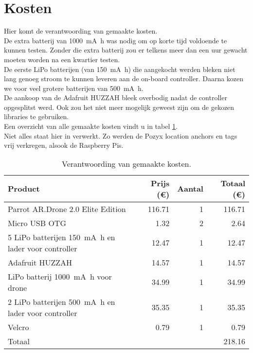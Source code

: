 \section{Kosten}
Hier komt de verantwoording van gemaakte kosten.\\
De extra batterij van \SI{1000}{\mA\hour} was nodig om op korte tijd voldoende te kunnen testen. Zonder die extra batterij zou er telkens meer dan een uur gewacht moeten worden na een kwartier testen.\\
De eerste LiPo batterijen (van \SI{150}{\mA\hour}) die aangekocht werden bleken niet lang genoeg stroom te kunnen leveren aan de on-board controller. Daarna kozen we voor veel grotere batterijen van \SI{500}{\mA\hour}.\\
De aankoop van de Adafruit HUZZAH bleek overbodig nadat de controller opgesplitst werd. Ook zou het niet meer mogelijk geweest zijn om de gekozen libraries te gebruiken.\\

Een overzicht van alle gemaakte kosten vindt u in tabel \ref{tab:kosten}.\\
Niet alles staat hier in verwerkt. Zo werden de Pozyx location anchors en tags vrij verkregen, alsook de Raspberry Pis.
\begin{table}[p]
\centering
\begin{tabular}{ |l|r|r|r| } \hline
Product & Prijs (\euro{}) & Aantal & Totaal (\euro{}) \\ [.5ex] \hline \hline
Parrot AR.Drone 2.0 Elite Edition & 116.71 & 1 & 116.71 \\ \hline
Micro USB OTG & 1.32 & 2 & 2.64 \\ \hline
5 LiPo batterijen \SI{150}{\mA\hour} en lader voor controller & 12.47 & 1 & 12.47 \\ \hline
Adafruit HUZZAH & 14.57 & 1 & 14.57 \\ \hline
LiPo batterij \SI{1000}{\mA\hour} voor drone & 34.99 & 1 & 34.99 \\ \hline
2 LiPo batterijen \SI{500}{\mA\hour} en lader voor controller & 35.35 & 1 & 35.35 \\ [.5ex] \hline
Velcro & 0.79 & 1 & 0.79 \\ \hline
\hline
Totaal & & & 218.16 \\ \hline
\end{tabular}
\caption[Kosten]{Verantwoording van gemaakte kosten.}
\label{tab:kosten}
\end{table}